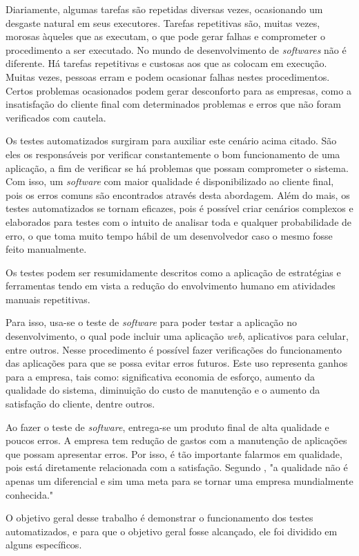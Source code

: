 \par Diariamente, algumas tarefas são repetidas diversas vezes, ocasionando um desgaste natural em seus executores. Tarefas repetitivas são, muitas vezes, morosas àqueles que as executam, o que pode gerar falhas e comprometer o procedimento a ser executado. No mundo de desenvolvimento de \textit{softwares} não é diferente. Há tarefas repetitivas e custosas aos que as colocam em execução. Muitas vezes, pessoas erram e podem ocasionar falhas nestes procedimentos. Certos problemas ocasionados podem gerar desconforto para as empresas, como a insatisfação do cliente final com determinados problemas e erros que não foram verificados com cautela.

\par Os testes automatizados surgiram para auxiliar este cenário acima citado. São eles os responsáveis por verificar constantemente o bom funcionamento de uma aplicação, a fim de verificar se há problemas que possam comprometer o sistema. Com isso, um \textit{software} com maior qualidade é disponibilizado ao cliente final, pois os erros comuns são encontrados através desta abordagem. Além do mais, os testes automatizados se tornam eficazes, pois é possível criar cenários complexos e elaborados para testes com o intuito de analisar toda e qualquer probabilidade de erro, o que toma muito tempo hábil de um desenvolvedor caso o mesmo fosse feito manualmente.

\par Os testes podem ser resumidamente descritos como a aplicação de estratégias e ferramentas tendo em vista a redução do envolvimento humano em atividades manuais repetitivas.

\par Para isso, usa-se o teste de \textit{software} para poder testar a aplicação no desenvolvimento, o qual pode incluir uma aplicação \textit{web}, aplicativos para celular, entre outros. Nesse procedimento é possível fazer verificações do funcionamento das aplicações para que se possa evitar erros futuros. Este uso representa ganhos para a empresa, tais como: significativa economia de esforço, aumento da qualidade do sistema, diminuição do custo de manutenção e o aumento da satisfação do cliente, dentre outros.

\par Ao fazer o teste de \textit{software}, entrega-se um produto final de alta qualidade e poucos erros. A empresa tem redução de gastos com a manutenção de aplicações que possam apresentar erros. Por isso, é tão importante falarmos em qualidade, pois está diretamente relacionada com a satisfação. Segundo , "a qualidade não é apenas um diferencial e sim uma meta para se tornar uma empresa mundialmente conhecida."
\par O objetivo geral desse trabalho é demonstrar o funcionamento dos testes automatizados, e para que o objetivo geral fosse alcançado, ele foi dividido em alguns específicos.


